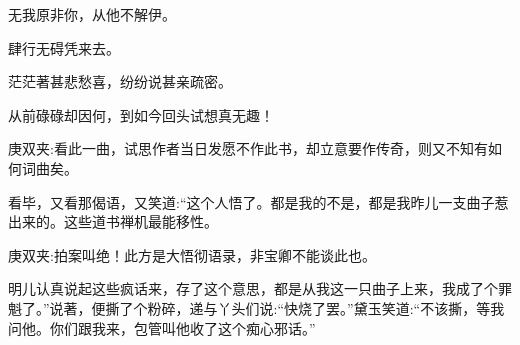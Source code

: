 \begin{poem}
    \begin{pl}无我原非你，从他不解伊。\end{pl}

    \begin{pl}肆行无碍凭来去。\end{pl}

    \begin{pl}茫茫著甚悲愁喜，纷纷说甚亲疏密。\end{pl}

    \begin{pl}从前碌碌却因何，到如今回头试想真无趣！\end{pl}
    \begin{note}庚双夹:看此一曲，试思作者当日发愿不作此书，却立意要作传奇，则又不知有如何词曲矣。\end{note}
\end{poem}


\begin{parag}
    看毕，又看那偈语，又笑道:“这个人悟了。都是我的不是，都是我昨儿一支曲子惹出来的。这些道书禅机最能移性。\begin{note}庚双夹:拍案叫绝！此方是大悟彻语录，非宝卿不能谈此也。\end{note}明儿认真说起这些疯话来，存了这个意思，都是从我这一只曲子上来，我成了个罪魁了。”说著，便撕了个粉碎，递与丫头们说:“快烧了罢。”黛玉笑道:“不该撕，等我问他。你们跟我来，包管叫他收了这个痴心邪话。”
\end{parag}


